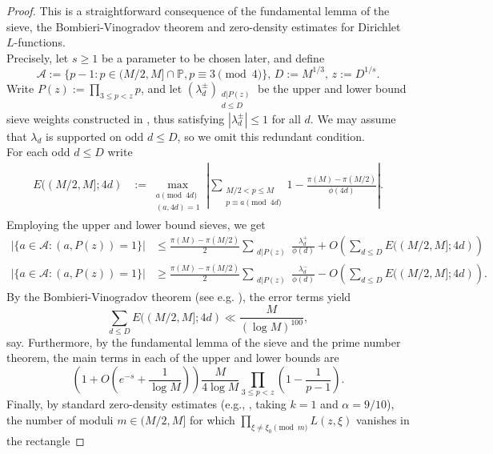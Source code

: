 \documentclass[10pt]{amsart}
\theoremstyle{definition}
\newcommand{\mc}{\mathcal}
\newcommand{\mb}{\mathbb}
\renewcommand{\ss}{\substack}
\newcommand{\e}{\varepsilon}
\begin{document}
\begin{proof}
This is a straightforward consequence of the fundamental lemma of the sieve, the Bombieri-Vinogradov theorem and zero-density estimates for Dirichlet $L$-functions. \\ Precisely, let $s \geq 1$ be a parameter to be chosen later, and define
$$
\mc{A} := \{p-1 : p \in (M/2,M] \cap \mb{P}, p \equiv 3 \pmod{4}\}, \, D := M^{1/3}, \, z := D^{1/s}.
$$ 
Write $P(z) := \prod_{3 \leq p < z} p$, and let $(\lambda_d^{\pm})_{\ss{d|P(z) \\ d \leq D}}$ be the upper and lower bound sieve weights constructed in \cite[Lem. 6.3]{IK}, thus satisfying $|\lambda_d^\pm| \leq 1$ for all $d$. We may assume that $\lambda_d$ is supported on odd $d \leq D$, so we omit this redundant condition. \\ 
For each odd $d \leq D$ write
\begin{align*}
E((M/2,M];4d) &:= \max_{\ss{a \pmod{4d} \\ (a,4d) = 1}} \left|\sum_{\ss{M/2 < p \leq M \\ p \equiv a \pmod{4d}}} 1  - \frac{\pi(M)-\pi(M/2)}{\phi(4d)}\right|.
\end{align*}
Employing the upper and lower bound sieves, we get
\begin{align*}
|\{a \in \mc{A} : (a,P(z)) = 1\}| &\leq \frac{\pi(M)-\pi(M/2)}{2} \sum_{\ss{d|P(z)}} \frac{\lambda_d^+}{\phi(d)} + O\left(\sum_{d \leq D} E((M/2,M];4d)\right) \\ 
|\{a \in \mc{A} : (a,P(z)) = 1\}| &\geq \frac{\pi(M)-\pi(M/2)}{2}\sum_{\ss{d|P(z)}} \frac{\lambda_d^-}{\phi(d)} - O\left(\sum_{d \leq D} E((M/2,M];4d)\right). 
\end{align*}
By the Bombieri-Vinogradov theorem (see e.g. \cite[Thm. 17.1]{IK}), the error terms yield
$$
\sum_{d \leq D} E((M/2,M];4d) \ll \frac{M}{(\log M)^{100}},
$$
say. %
Furthermore, by the fundamental lemma of the sieve \cite[Lem. 6.3]{IK} and the prime number theorem, the main terms in each of the upper and lower bounds are
$$
\left(1+O\left(e^{-s} + \frac{1}{\log M}\right)\right)\frac{M}{4\log M} \prod_{3 \leq p < z} \left(1-\frac{1}{p-1}\right).
$$
Finally, by standard zero-density estimates (e.g., \cite[(10.7)]{IK}, taking $k = 1$ and $\alpha = 9/10$), the number of moduli $m \in (M/2,M]$ for which $\prod_{\xi \neq \xi_0 \pmod{m}} L(z,\xi)$ vanishes in the rectangle

\end{proof}
\end{document}
